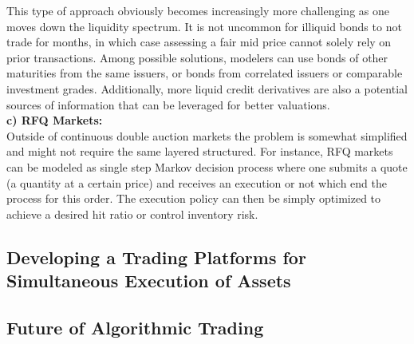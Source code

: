 This type of approach obviously becomes increasingly more challenging as one moves down the liquidity spectrum. It is not uncommon for illiquid bonds to not trade for months, in which case assessing a fair mid price cannot solely rely on prior transactions. Among possible solutions, modelers can use bonds of other maturities from the same issuers, or bonds from correlated issuers or comparable investment grades. Additionally, more liquid credit derivatives are also a potential sources of information that can be leveraged for better valuations.\\

\noindent\textbf{c) RFQ Markets:} \\

Outside of continuous double auction markets the problem is somewhat simplified and might not require the same layered structured. For instance, RFQ markets can be modeled as single step Markov decision process where one submits a quote (a quantity at a certain price) and receives an execution or not which end the process for this order. The execution policy can then be simply optimized to achieve a desired hit ratio or control inventory risk.


\subsection{Developing a Trading Platforms for Simultaneous Execution of Assets}
\subsection{Future of Algorithmic Trading}